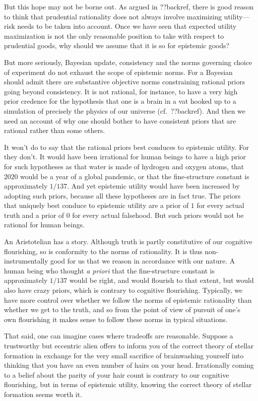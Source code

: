 But this hope may not be borne out. As argued in ??backref, there is good reason to think that prudential 
rationality does not always involve maximizing utility---risk needs to be taken into account. Once we have
seen that expected utility maximization is not the only reasonable position to take with respect to prudential
goods, why should we assume that it is so for epistemic goods?

But more seriously, Bayesian update, consistency and the norms governing choice of experiment do not exhaust the 
scope of epistemic norms. For a Bayesian should admit there are substantive objective norms constraining 
rational priors going beyond consistency. It is not rational, for instance, to have a very high
prior credence for the hypothesis that one is a brain in a vat hooked up to a simulation of precisely the 
physics of our universe (cf.\ ??backref). And then we need an account of why one should bother to have consistent 
priors that are rational rather than some others.

It won't do to say that the rational priors best conduces to epistemic utility. For they don't. It would 
have been irrational for human beings to have a high prior for such hypotheses as that water is made of hydrogen
and oxygen atoms, that 2020 would be a year of a global pandemic, or that the fine-structure constant is 
approximately $1/137$. And yet epistemic utility would have been increased by adopting such priors, because 
all these hypotheses are in fact true. The priors that uniquely best conduce to epistemic utility are a 
prior of $1$ for every actual truth and a prior of $0$ for every actual falsehood. But such priors would not 
be rational for human beings. 

An Aristotelian has a story. Although truth is partly constitutive of our cognitive flourishing, so is conformity 
to the norms of rationality. It is thus non-instrumentally good for us that we reason in accordance with our 
nature. A human being who thought \textit{a priori} that the fine-structure constant is approximately $1/137$
would be right, and would flourish to that extent, but would also have crazy priors, which is contrary to 
cognitive flourishing. Typically, we have more control over whether we follow the norms of epistemic rationality
than whether we get to the truth, and so from the point of view of pursuit of one's own flourishing it makes
sense to follow these norms in typical situations.

That said, one can imagine cases where tradeoffs are reasonable. Suppose a trustworthy but eccentric alien
offers to inform you of the correct theory of stellar formation in exchange for the very small sacrifice 
of brainwashing yourself into thinking that you have an even number of hairs on your head. Irrationally
coming to a belief about the parity of your hair count is contrary to our cognitive flourishing, but in terms 
of epistemic utility, knowing the correct theory of stellar formation seems worth it.

